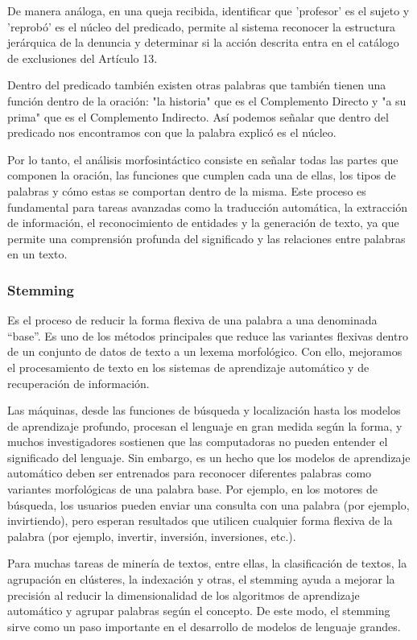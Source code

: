 De manera análoga, en una queja recibida, identificar que 'profesor' es el sujeto y 'reprobó' es el núcleo del predicado, permite al sistema reconocer la estructura jerárquica de la denuncia y determinar si la acción descrita entra en el catálogo de exclusiones del Artículo 13.

Dentro del predicado también existen otras palabras que también tienen una función dentro de la oración: "la historia" que es el Complemento Directo y "a su prima" que es el Complemento Indirecto. Así podemos señalar que dentro del predicado nos encontramos con que la palabra explicó es el núcleo.

Por lo tanto, el análisis morfosintáctico consiste en señalar todas las partes que componen la oración, las funciones que cumplen cada una de ellas, los tipos de palabras y cómo estas se comportan dentro de la misma. Este proceso es fundamental para tareas avanzadas como la traducción automática, la extracción de información, el reconocimiento de entidades y la generación de texto, ya que permite una comprensión profunda del significado y las relaciones entre palabras en un texto.

\subsubsection{Stemming}

Es el proceso de reducir la forma flexiva de una palabra a una denominada “base”. Es uno de los métodos principales que reduce las variantes flexivas dentro de un conjunto de datos de texto a un lexema morfológico. Con ello, mejoramos el procesamiento de texto en los sistemas de aprendizaje automático y de recuperación de información.

Las máquinas, desde las funciones de búsqueda y localización hasta los modelos de aprendizaje profundo, procesan el lenguaje en gran medida según la forma, y muchos investigadores sostienen que las computadoras no pueden entender el significado del lenguaje. Sin embargo, es un hecho que los modelos de aprendizaje automático deben ser entrenados para reconocer diferentes palabras como variantes morfológicas de una palabra base. Por ejemplo, en los motores de búsqueda, los usuarios pueden enviar una consulta con una palabra (por ejemplo, invirtiendo), pero esperan resultados que utilicen cualquier forma flexiva de la palabra (por ejemplo, invertir, inversión, inversiones, etc.).

Para muchas tareas de minería de textos, entre ellas, la clasificación de textos, la agrupación en clústeres, la indexación y otras, el stemming ayuda a mejorar la precisión al reducir la dimensionalidad de los algoritmos de aprendizaje automático y agrupar palabras según el concepto. De este modo, el stemming sirve como un paso importante en el desarrollo de modelos de lenguaje grandes.

